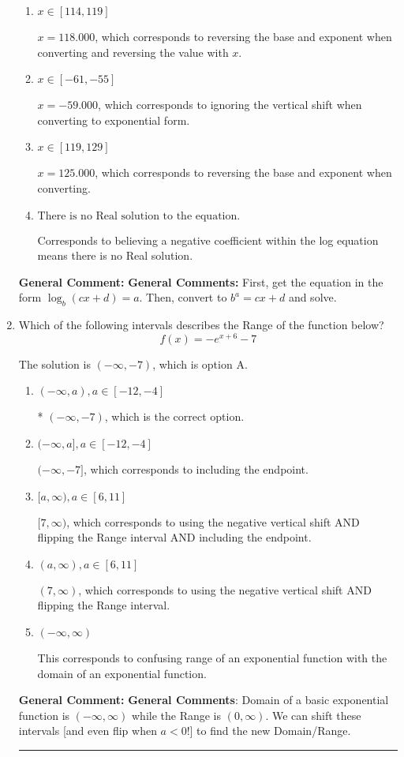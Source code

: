 \documentclass{extbook}[14pt]
\newcommand{\litem}[1]{\item #1

\rule{\textwidth}{0.4pt}}
\begin{document}
\begin{enumerate}
{\begin{enumerate}[label=\Alph*.]
* $x = 3.496$, which is the correct option.
\item \( x \in [114, 119] \)

$x = 118.000$, which corresponds to reversing the base and exponent when converting and reversing the value with $x$.
\item \( x \in [-61, -55] \)

$x = -59.000$, which corresponds to ignoring the vertical shift when converting to exponential form.
\item \( x \in [119, 129] \)

$x = 125.000$, which corresponds to reversing the base and exponent when converting.
\item \( \text{There is no Real solution to the equation.} \)

Corresponds to believing a negative coefficient within the log equation means there is no Real solution.
\end{enumerate}

\textbf{General Comment:} \textbf{General Comments:} First, get the equation in the form $\log_b{(cx+d)} = a$. Then, convert to $b^a = cx+d$ and solve.
}
\litem{
Which of the following intervals describes the Range of the function below?
\[ f(x) = -e^{x+6}-7 \]

The solution is \( (-\infty, -7) \), which is option A.\begin{enumerate}[label=\Alph*.]
\item \( (-\infty, a), a \in [-12, -4] \)

* $(-\infty, -7)$, which is the correct option.
\item \( (-\infty, a], a \in [-12, -4] \)

$(-\infty, -7]$, which corresponds to including the endpoint.
\item \( [a, \infty), a \in [6, 11] \)

$[7, \infty)$, which corresponds to using the negative vertical shift AND flipping the Range interval AND including the endpoint.
\item \( (a, \infty), a \in [6, 11] \)

$(7, \infty)$, which corresponds to using the negative vertical shift AND flipping the Range interval.
\item \( (-\infty, \infty) \)

This corresponds to confusing range of an exponential function with the domain of an exponential function.
\end{enumerate}

\textbf{General Comment:} \textbf{General Comments}: Domain of a basic exponential function is $(-\infty, \infty)$ while the Range is $(0, \infty)$. We can shift these intervals [and even flip when $a<0$!] to find the new Domain/Range.
}
\end{enumerate}
\end{document}
